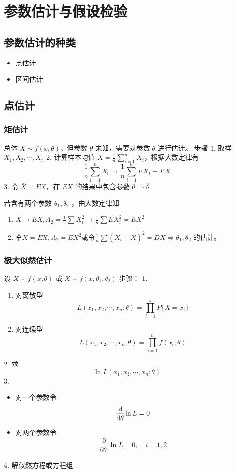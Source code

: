 \chapter{参数估计与假设检验}

\section{参数估计的种类}
\label{sec:参数估计的种类}

\begin{itemize}
    \item 点估计
    \item 区间估计
\end{itemize}

\section{点估计}
\label{sec:点估计}

\subsection{矩估计}
\label{sub:矩估计}

总体 $X \sim f(x, \theta)$，但参数 $\theta$ 未知，需要对参数 $\theta$ 进行估计。
步骤
1. 取样$X_1, X_2, \cdots, X_n$
2. 计算样本均值 $\bar{X} = \frac{1}{n} \sum_{i=1}^n X_i$，根据大数定律有
\[
    \frac{1}{n} \sum_{i=1}^{n} X_i \to \frac{1}{n} \sum_{i=1}^n EX_i = EX
\]
3. 令 $\bar{X} = EX$，在 $EX$ 的结果中包含参数 $\theta \Rightarrow \hat{\theta}$

若含有两个参数 $\theta_1, \theta_2$ ，由大数定律知
\begin{enumerate}
    \item $\bar{X} \to EX, A_2 = \frac{1}{n} \sum X_i^2 \to \frac{1}{n} \sum EX_i^2 =  EX^2$
    \item 令$\bar{X} = EX, A_2 = EX^2$或令$\frac{1}{n} \sum \left(X_i-\bar{X}\right)^2=DX \Rightarrow \theta_1, \theta_2$ 的估计。
\end{enumerate}


\subsection{极大似然估计}
\label{sub:极大似然估计}

设 $X \sim f(x, \theta)$ 或 $X \sim f(x, \theta_1, \theta_2)$
步骤：
1.
\begin{enumerate}
    \item 对离散型
    \[
        L(x_1, x_2, \cdots, x_n; \theta) = \prod_{i=1}^n P\{X = x_i\}
    \]
    \item 对连续型
    \[
        L(x_1, x_2, \cdots , x_n; \theta) = \prod_{i=1}^n f(x_i; \theta)
    \]
\end{enumerate}
2. 求
\[
    \ln L(x_1, x_2, \cdots , x_n; \theta)
\]
3.
\begin{itemize}
    \item 对一个参数令
    \[
        \frac{\dif}{\dif \theta} \ln L = 0
    \]
    \item 对两个参数令
    \[
        \frac{\partial}{\partial\theta_i} \ln L = 0, \quad i = 1, 2
    \]
\end{itemize}
4. 解似然方程或方程组



